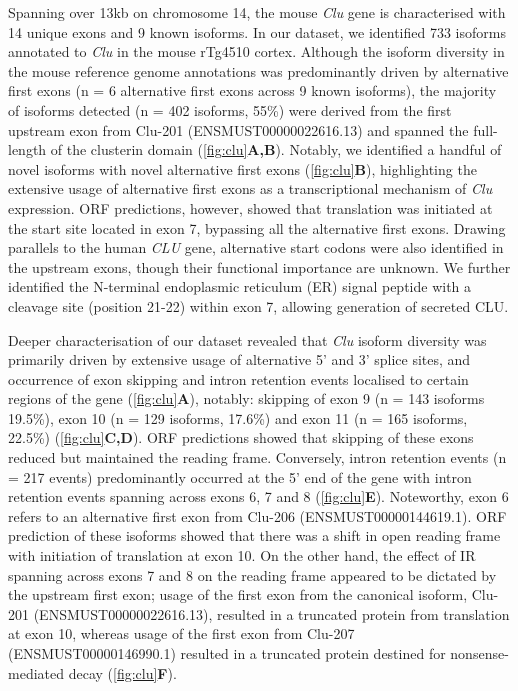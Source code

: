 Spanning over 13kb on chromosome 14, the mouse \textit{Clu} gene is characterised with 14 unique exons and 9 known isoforms. In our dataset, we identified 733 isoforms annotated to \textit{Clu} in the mouse rTg4510 cortex. Although the isoform diversity in the mouse reference genome annotations was predominantly driven by alternative first exons (n = 6 alternative first exons across 9 known isoforms), the majority of isoforms detected (n = 402 isoforms, 55\%) were derived from the first upstream exon from Clu-201 (ENSMUST00000022616.13) and spanned the full-length of the clusterin domain (\cref{fig:clu}\textbf{A,B}). Notably, we identified a handful of novel isoforms with novel alternative first exons (\cref{fig:clu}\textbf{B}), highlighting the extensive usage of alternative first exons as a transcriptional mechanism of \textit{Clu} expression. ORF predictions, however, showed that translation was initiated at the start site located in exon 7, bypassing all the alternative first exons. Drawing parallels to the human \textit{CLU} gene\cite{Foster2019}, alternative start codons were also identified in the upstream exons, though their functional importance are unknown. We further identified the N-terminal endoplasmic reticulum (ER) signal peptide with a cleavage site (position 21-22) within exon 7, allowing generation of secreted CLU\cite{Foster2019}.   

Deeper characterisation of our dataset revealed that \textit{Clu} isoform diversity was primarily driven by extensive usage of alternative 5' and 3' splice sites, and occurrence of exon skipping and intron retention events localised to certain regions of the gene (\cref{fig:clu}\textbf{A}), notably: skipping of exon 9 (n = 143 isoforms  19.5\%), exon 10 (n = 129 isoforms, 17.6\%) and exon 11 (n = 165 isoforms, 22.5\%) (\cref{fig:clu}\textbf{C,D}). ORF predictions showed that skipping of these exons reduced but maintained the reading frame. Conversely, intron retention events (n = 217 events) predominantly occurred at the 5' end of the gene with intron retention events spanning across exons 6, 7 and 8 (\cref{fig:clu}\textbf{E}). Noteworthy, exon 6 refers to an alternative first exon from Clu-206 (ENSMUST00000144619.1). ORF prediction of these isoforms showed that there was a shift in open reading frame with initiation of translation at exon 10. On the other hand, the effect of IR spanning across exons 7 and 8 on the reading frame appeared to be dictated by the upstream first exon; usage of the first exon from the canonical isoform, Clu-201 (ENSMUST00000022616.13), resulted in a truncated protein from translation at exon 10, whereas usage of the first exon from Clu-207 (ENSMUST00000146990.1) resulted in a truncated protein destined for nonsense-mediated decay (\cref{fig:clu}\textbf{F}). 



